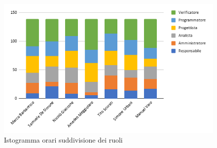             \begin{figure}[!h]
                \caption{Istogramma orari suddivisione dei ruoli}
                \vspace{5px}
                \includegraphics[scale=0.6]{../../../Images/Diagrammi/Istogrammi/ore totali.png}
                \centering
            \end{figure}

